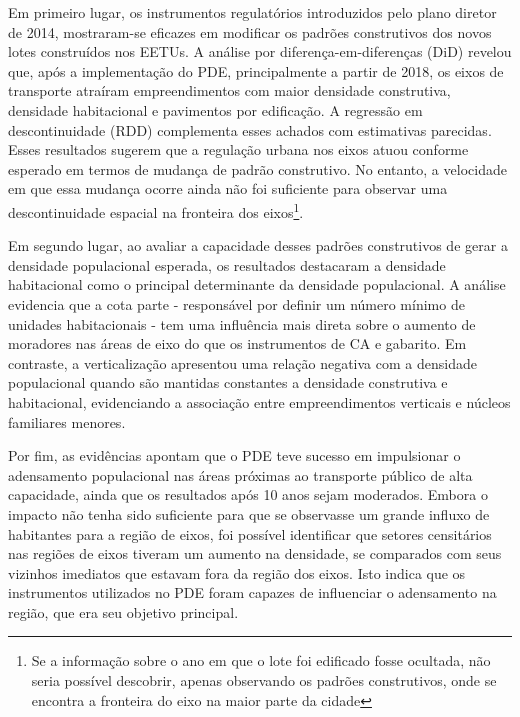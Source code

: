 Em primeiro lugar, os instrumentos regulatórios introduzidos pelo plano diretor de 2014, mostraram-se eficazes em modificar os padrões construtivos dos novos lotes construídos nos EETUs. A análise por diferença-em-diferenças (DiD) revelou que, após a implementação do PDE, principalmente a partir de 2018, os eixos de transporte atraíram empreendimentos com maior densidade construtiva, densidade habitacional e pavimentos por edificação. A regressão em descontinuidade (RDD) complementa esses achados com estimativas parecidas. Esses resultados sugerem que a regulação urbana nos eixos atuou conforme esperado em termos de mudança de padrão construtivo. No entanto, a velocidade em que essa mudança ocorre ainda não foi suficiente para observar uma descontinuidade espacial na fronteira dos eixos\footnote{Se a informação sobre o ano em que o lote foi edificado fosse ocultada, não seria possível descobrir, apenas observando os padrões construtivos, onde se encontra a fronteira do eixo na maior parte da cidade}.

Em segundo lugar, ao avaliar a capacidade desses padrões construtivos de gerar a densidade populacional esperada, os resultados destacaram a densidade habitacional como o principal determinante da densidade populacional. A análise evidencia que a cota parte - responsável por definir um número mínimo de unidades habitacionais - tem uma influência mais direta sobre o aumento de moradores nas áreas de eixo do que os instrumentos de CA e gabarito. Em contraste, a verticalização apresentou uma relação negativa com a densidade populacional quando são mantidas constantes a densidade construtiva e habitacional, evidenciando a associação entre empreendimentos verticais e núcleos familiares menores. 


Por fim, as evidências apontam que o PDE teve sucesso em impulsionar o adensamento populacional nas áreas próximas ao transporte público de alta capacidade, ainda que os resultados após 10 anos sejam moderados. Embora o impacto não tenha sido suficiente para que se observasse um grande influxo de habitantes para a região de eixos, foi possível identificar que setores censitários nas regiões de eixos tiveram um aumento na densidade, se comparados com seus vizinhos imediatos que estavam fora da região dos eixos. Isto indica que os instrumentos utilizados no PDE foram capazes de influenciar o adensamento na região, que era seu objetivo principal.


